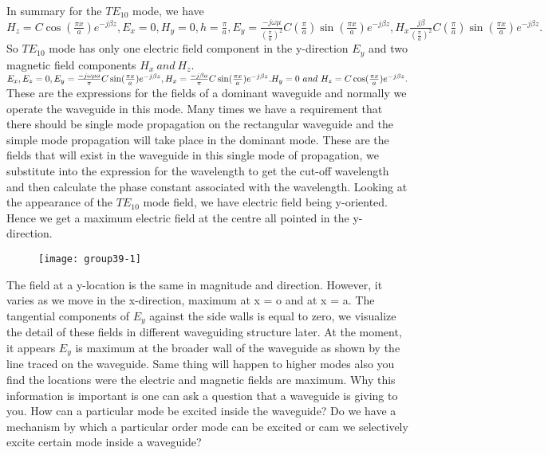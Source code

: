 	\paragraph{}In summary for the $TE_{10}$ mode, we have $H_z = C\cos(\frac{\pi x}{a})e^{-j\beta z}, E_x = 0, H_y = 0, h = \frac{\pi}{a}, E_y = 	\frac{-j\omega\mu }{(\frac{\pi}{a})^2}C(\frac{\pi}{a})\sin(\frac{\pi x}{a})e^{-j\beta z}, H_x \frac{j\beta}{(\frac{\pi}{a})^2}C(\frac{\pi}{a})\sin(\frac{\pi x}{a})e^{-j\beta z}.$ So $TE_{10}$ mode has only one electric field component in the y-direction $E_y$ and two magnetic field components $H_x\ and\ H_z$. $E_x, E_z = 0, E_y = \frac{-j\omega\mu a}{\pi}C\sin(\frac{\pi x}{a})e^{-j\beta z}, H_x = \frac{-j\beta a}{\pi}C\sin(\frac{\pi x}{a})e^{-j\beta z}.\\ H_y = 0\ and\ H_z = C\cos(\frac{\pi x}{a})e^{-j\beta z}.$ These are the expressions for the fields of a dominant waveguide and normally we operate the waveguide in this mode. Many times we have a requirement that there should be single mode propagation on the rectangular waveguide and the simple mode propagation will take place in the dominant mode. These are the fields that will exist in the waveguide in this single mode of propagation, we substitute into the expression for the wavelength to get the cut-off wavelength and then calculate the phase constant associated with the wavelength. Looking at the appearance of the $TE_{10}$ mode field, we have electric field being y-oriented. Hence we get a maximum electric field at the centre all pointed in the y-direction.
	\begin{figure}[h]
		\centering
		\texttt{[image: group39-1]}
		\caption{}
	\end{figure}
	 The field at a y-location is the same in magnitude and direction. However, it varies as we move in the x-direction, maximum at x = o and at x = a. The tangential components of $E_y$ against the side walls is equal to zero, we visualize the detail of these fields in different waveguiding structure later. At the moment, it appears $E_y$ is maximum at the broader wall of the waveguide as shown by the line traced on the waveguide. Same thing will happen to higher modes also you find the locations were the electric and magnetic fields are maximum. Why this information is important is one can ask a question that a waveguide is giving to you. How can a particular mode be excited inside the waveguide? Do we have a mechanism by which a particular order mode can be excited or cam we selectively excite certain mode inside a waveguide?
